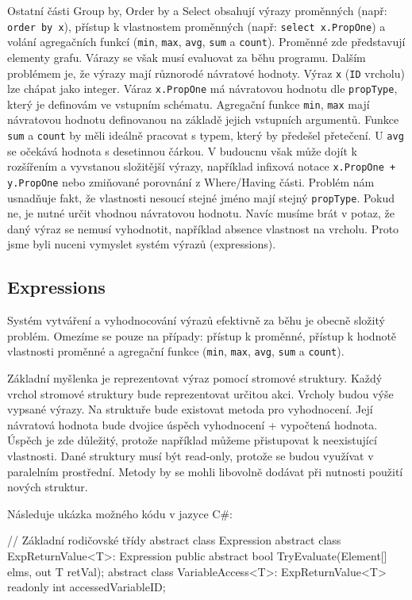Ostatní části Group by, Order by a Select obsahují výrazy proměnných (např: \texttt{order by x}), přístup k vlastnostem proměnných (např: \texttt{select x.PropOne}) a volání agregačních funkcí (\verb+min+, \verb+max+, \verb+avg+, \verb+sum+ a \verb+count+).
Proměnné zde představují elementy grafu.
Várazy se však musí evaluovat za běhu programu.
Dalším problémem je, že výrazy mají různorodé návratové hodnoty.
Výraz \texttt{x} (\verb+ID+ vrcholu) lze chápat jako integer.
Váraz \texttt{x.PropOne} má návratovou hodnotu dle \verb+propType+, který je definovám ve vstupním schématu.
Agregační funkce \verb+min+, \verb+max+ mají návratovou hodnotu definovanou na základě jejich vstupních argumentů.
Funkce \verb+sum+ a \verb+count+ by měli ideálně pracovat s typem, který by předešel přetečení.
U \verb+avg+ se očekává hodnota s desetinnou čárkou.  
V budoucnu však může dojít k rozšířením a vyvstanou složitější výrazy, například infixová notace \texttt{x.PropOne + y.PropOne} nebo zmiňované porovnání z Where/Having části.
Problém nám usnadňuje fakt, že vlastnosti nesoucí stejné jméno mají stejný \verb+propType+.
Pokud ne, je nutné určit vhodnou návratovou hodnotu.
Navíc musíme brát v potaz, že daný výraz se nemusí vyhodnotit, například absence vlastnost na vrcholu.
Proto jsme byli nuceni vymyslet systém výrazů (expressions).

\subsection{Expressions} \label{anal.expressions}

Systém vytváření a vyhodnocování výrazů efektivně za běhu je obecně složitý problém.
Omezíme se pouze na případy: přístup k proměnné, přístup k hodnotě vlastnosti proměnné a agregační funkce (\verb+min+, \verb+max+, \verb+avg+, \verb+sum+ a \verb+count+).

Základní myšlenka je reprezentovat výraz pomocí stromové struktury. 
Každý vrchol stromové struktury bude reprezentovat určitou akci.
Vrcholy budou výše vypsané výrazy. 
Na struktuře bude existovat metoda pro vyhodnocení.
Její návratová hodnota bude dvojice úspěch vyhodnocení + vypočtená hodnota.
Úspěch je zde důležitý, protože například můžeme přistupovat k neexistující vlastnosti. 
Dané struktury musí být read-only, protože se budou využívat v paralelním prostřední.
Metody by se mohli libovolně dodávat při nutnosti použití nových struktur. 

Následuje ukázka možného kódu v jazyce C\#:
\begin{code}
// Základní rodičovské třídy
abstract class Expression { }
abstract class ExpReturnValue<T>: Expression {
  public abstract bool TryEvaluate(Element[] elms, out T retVal); 
}
abstract class VariableAccess<T>: ExpReturnValue<T> {
     readonly int accessedVariableID; }
\end{code}

